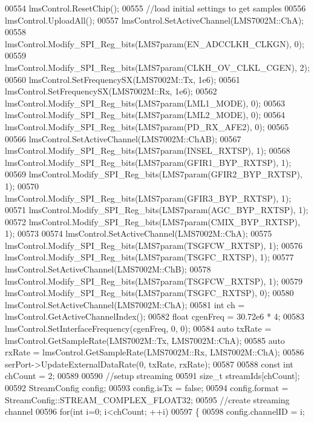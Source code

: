 \begin{DoxyCode}
{{{{{{00554     lmsControl.ResetChip();
00555     \textcolor{comment}{//load initial settings to get samples}
00556     lmsControl.UploadAll();
00557     lmsControl.SetActiveChannel(LMS7002M::ChA);
00558     lmsControl.Modify_SPI_Reg_bits(LMS7param(EN_ADCCLKH_CLKGN), 0);
00559     lmsControl.Modify_SPI_Reg_bits(LMS7param(CLKH_OV_CLKL_CGEN), 2);
00560     lmsControl.SetFrequencySX(LMS7002M::Tx, 1e6);
00561     lmsControl.SetFrequencySX(LMS7002M::Rx, 1e6);
00562     lmsControl.Modify_SPI_Reg_bits(LMS7param(LML1_MODE), 0);
00563     lmsControl.Modify_SPI_Reg_bits(LMS7param(LML2_MODE), 0);
00564     lmsControl.Modify_SPI_Reg_bits(LMS7param(PD_RX_AFE2), 0);
00565 
00566     lmsControl.SetActiveChannel(LMS7002M::ChAB);
00567     lmsControl.Modify_SPI_Reg_bits(LMS7param(INSEL_RXTSP), 1);
00568     lmsControl.Modify_SPI_Reg_bits(LMS7param(GFIR1_BYP_RXTSP), 1);
00569     lmsControl.Modify_SPI_Reg_bits(LMS7param(GFIR2_BYP_RXTSP), 1);
00570     lmsControl.Modify_SPI_Reg_bits(LMS7param(GFIR3_BYP_RXTSP), 1);
00571     lmsControl.Modify_SPI_Reg_bits(LMS7param(AGC_BYP_RXTSP), 1);
00572     lmsControl.Modify_SPI_Reg_bits(LMS7param(CMIX_BYP_RXTSP), 1);
00573 
00574     lmsControl.SetActiveChannel(LMS7002M::ChA);
00575     lmsControl.Modify_SPI_Reg_bits(LMS7param(TSGFCW_RXTSP), 1);
00576     lmsControl.Modify_SPI_Reg_bits(LMS7param(TSGFC_RXTSP), 1);
00577     lmsControl.SetActiveChannel(LMS7002M::ChB);
00578     lmsControl.Modify_SPI_Reg_bits(LMS7param(TSGFCW_RXTSP), 1);
00579     lmsControl.Modify_SPI_Reg_bits(LMS7param(TSGFC_RXTSP), 0);
00580     lmsControl.SetActiveChannel(LMS7002M::ChA);
00581     \textcolor{keywordtype}{int} ch = lmsControl.GetActiveChannelIndex();
00582     \textcolor{keywordtype}{float} cgenFreq = 30.72e6 * 4;
00583     lmsControl.SetInterfaceFrequency(cgenFreq, 0, 0);
00584     \textcolor{keyword}{auto} txRate = lmsControl.GetSampleRate(LMS7002M::Tx, LMS7002M::ChA);
00585     \textcolor{keyword}{auto} rxRate = lmsControl.GetSampleRate(LMS7002M::Rx, LMS7002M::ChA);
00586     serPort->UpdateExternalDataRate(0, txRate, rxRate);
00587 
00588     \textcolor{keyword}{const} \textcolor{keywordtype}{int} chCount = 2;
00589 
00590     \textcolor{comment}{//setup streaming}
00591     \textcolor{keywordtype}{size\_t} streamIds[chCount];
00592     StreamConfig config;
00593     config.isTx = \textcolor{keyword}{false};
00594     config.format = StreamConfig::STREAM\_COMPLEX\_FLOAT32;
00595     \textcolor{comment}{//create streaming channel}
00596     \textcolor{keywordflow}{for}(\textcolor{keywordtype}{int} i=0; i<chCount; ++i)
00597     \{
00598         config.channelID = i;
}}}}}}
\end{DoxyCode}
